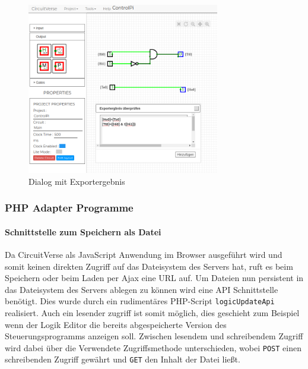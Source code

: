 \begin{figure}[H]
	\begin{center}
		\includegraphics[width=0.75\textwidth ,clip]{./images/circuitverseLogicBrightPrompt.png}
		\caption{Dialog mit Exportergebnis}
		\label{img:circuitVerseBrightPrompt}
	\end{center} 
\end{figure}




\subsubsection{PHP Adapter Programme}\label{kap:ums:adapterphp}
\paragraph{Schnittstelle zum Speichern als Datei}\label{par:saveFile}
Da CircuitVerse als JavaScript Anwendung im Browser ausgeführt wird und somit keinen direkten Zugriff auf das Dateisystem des Servers hat, ruft es beim Speichern oder beim Laden per Ajax eine URL auf. Um Dateien nun persistent in das Dateisystem des Servers ablegen zu können wird eine API Schnittstelle benötigt. Dies wurde durch ein rudimentäres PHP-Script \texttt{logicUpdateApi} realisiert. Auch ein lesender zugriff ist somit möglich, dies geschieht zum Beispiel wenn der Logik Editor die bereits abgespeicherte Version des Steuerungsprogramms anzeigen soll. Zwischen lesendem und schreibendem Zugriff wird dabei über die Verwendete Zugriffsmethode unterschieden, wobei \texttt{POST} einen schreibenden Zugriff gewährt und \texttt{GET} den Inhalt der Datei ließt. 
